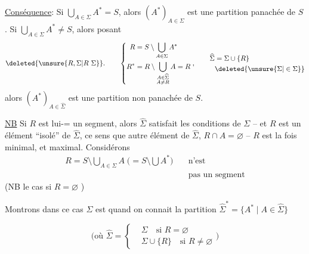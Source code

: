 \uline{Conséquence}: Si $\bigcup_{A\in\Sigma}A^*=S$, alors  $(A^*)_{A\in\Sigma}$ est une partition   panachée de $S$. Si $\bigcup_{A\in\Sigma} A^*\ne S$, alors posant
\[
 \deleted{\unsure{R,\Sigma|R\ \Sigma}}\mathpunct{.}\qquad
 \left\{\begin{aligned}
 R&=S\setminus\bigcup_{A\in\Sigma}A^*\\
 R^*&=R\setminus\bigcup_{\substack{A\in\widehat\Sigma\\ A\ne R}}A=R
 \end{aligned}\right.,\qquad
 \begin{aligned}
 \widehat\Sigma&=\Sigma\cup\{R\}\\
 &\deleted{\unsure{\Sigma|\in\Sigma}}
 \end{aligned}
\]
alors $(A^*)_{A\in\widehat\Sigma}$ est une partition non panachée de $S$.

\uline{NB} Si $R$ est lui-= un segment, alors  $\widehat\Sigma$ satisfait les conditions de $\Sigma$ -- et $R$ est un élément  ``isolé'' de $\widehat\Sigma$,  ce sens que   autre élément  de $\widehat\Sigma$,   $R\cap A=\varnothing$ --   $R$ est  la fois minimal, et maximal. Considérons
\begingroup
\makeatletter\tagsleft@true\makeatother
\[
 \tag*{$(\sigma\ 3)$}
 \begin{aligned}
 R=S\setminus\bigcup_{A\in\Sigma}A\;
 \bigl(=S\setminus\bigcup A^*\bigr)&\quad\text{n'est}\\
 &\quad\text{pas un segment}
 \end{aligned}
\]
\endgroup
(NB  le cas si $R=\varnothing$ )

Montrons dans ce cas   $\Sigma$ est   quand on connait la partition $\widehat\Sigma^*=\{A^*\mid A\in\widehat\Sigma\}$

\[
 \bigl(\text{où }\widehat\Sigma=\left\{\begin{aligned}
 &\Sigma\quad\text{si }R=\varnothing\\
 &\Sigma\cup\{R\}\quad\text{si }R\ne\varnothing
 \end{aligned}\right.\bigr)
\]

